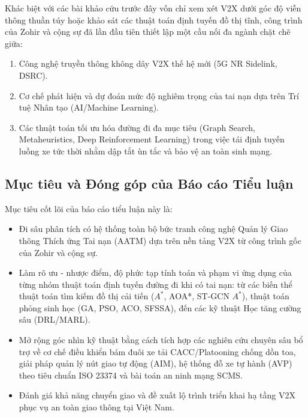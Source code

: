 \documentclass[a4paper]{article}
\begin{document}
Khác biệt với các bài khảo cứu trước đây vốn chỉ xem xét V2X dưới góc độ viễn thông thuần túy hoặc khảo sát các thuật toán định tuyến đồ thị tĩnh, công trình của Zohir và cộng sự đã lần đầu tiên thiết lập một cầu nối đa ngành chặt chẽ giữa:
\begin{enumerate}
    \item Công nghệ truyền thông không dây V2X thế hệ mới (5G NR Sidelink, DSRC).
    \item Cơ chế phát hiện và dự đoán mức độ nghiêm trọng của tai nạn dựa trên Trí tuệ Nhân tạo (AI/Machine Learning).
    \item Các thuật toán tối ưu hóa đường đi đa mục tiêu (Graph Search, Metaheuristics, Deep Reinforcement Learning) trong việc tái định tuyến luồng xe tức thời nhằm dập tắt ùn tắc và bảo vệ an toàn sinh mạng.
\end{enumerate}

\newpage
\subsection{Mục tiêu và Đóng góp của Báo cáo Tiểu luận}
Mục tiêu cốt lõi của báo cáo tiểu luận này là:
\begin{itemize}
    \item Đi sâu phân tích có hệ thống toàn bộ bức tranh công nghệ Quản lý Giao thông Thích ứng Tai nạn (AATM) dựa trên nền tảng V2X từ công trình gốc của Zohir và cộng sự.
    \item Làm rõ ưu - nhược điểm, độ phức tạp tính toán và phạm vi ứng dụng của từng nhóm thuật toán định tuyến đường đi khi có tai nạn: từ các biến thể thuật toán tìm kiếm đồ thị cải tiến ($A^*$, AOA*, ST-GCN $A^*$), thuật toán phỏng sinh học (GA, PSO, ACO, SFSSA), đến các kỹ thuật Học tăng cường sâu (DRL/MARL).
    \item Mở rộng góc nhìn kỹ thuật bằng cách tích hợp các nghiên cứu chuyên sâu bổ trợ về cơ chế điều khiển bám đuôi xe tải CACC/Platooning chống dồn toa, giải pháp quản lý nút giao tự động (AIM), hệ thống đỗ xe tự hành (AVP) theo tiêu chuẩn ISO 23374 và bài toán an ninh mạng SCMS.
    \item Đánh giá khả năng chuyển giao và đề xuất lộ trình triển khai hạ tầng V2X phục vụ an toàn giao thông tại Việt Nam.
\end{itemize}
\end{document}
